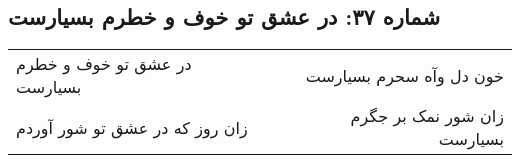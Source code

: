 \begin{center}
\section*{شماره ۳۷: در عشق تو خوف و خطرم بسیارست}
\label{sec:037}
\begin{longtable}{l p{0.5cm} r}
در عشق تو خوف و خطرم بسیارست
&&
خون دل وآه سحرم بسیارست
\\
زان روز که در عشق تو شور آوردم
&&
زان شور نمک بر جگرم بسیارست
\\
\end{longtable}
\end{center}
